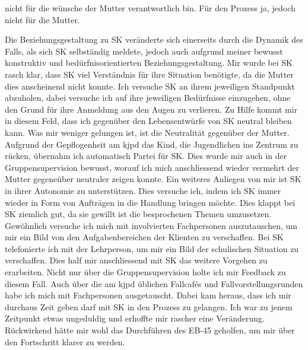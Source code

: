 nicht für die wünsche der Mutter verantwortlich bin. Für den Prozess ja, jedoch nicht für die Mutter. 

Die Beziehungsgestaltung zu SK veränderte sich einerseits durch die Dynamik des Falls, als sich SK selbständig meldete, jedoch auch aufgrund meiner bewusst konstruktiv und bedürfnisorientierten Beziehungsgestaltung. Mir wurde bei SK rasch klar, dass SK viel Verständnis für ihre Situation benötigte, da die Mutter dies anscheinend nicht konnte. Ich versuche SK an ihrem jeweiligen Standpunkt abzuholen, dabei versuche ich auf ihre jeweiligen Bedürfnisse einzugehen, ohne den Grund für ihre Anmeldung aus den Augen zu verlieren. Zu Hilfe kommt mir in diesem Feld, dass ich gegenüber den Lebensentwürfe von SK neutral bleiben kann. Was mir weniger gelungen ist, ist die Neutralität gegenüber der Mutter. Aufgrund der Gepflogenheit am \ac{kjpd} das Kind, die Jugendlichen ins Zentrum zu rücken, übernahm ich automatisch Partei für SK. Dies wurde mir auch in der Gruppensupervision bewusst, worauf ich mich anschliessend wieder vermehrt der Mutter gegeneüber neutraler zeigen konnte. Ein weiteres Anliegen von mir ist SK in ihrer Autonomie zu unterstützen. Dies versuche ich, indem ich SK immer wieder in Form von Aufträgen in die Handlung bringen möchte. Dies klappt bei SK ziemlich gut, da sie gewillt ist die besprochenen Themen umzusetzen. Gewöhnlich versuche ich mich mit involvierten Fachpersonen auszutauschen, um mir ein Bild von den Aufgabenbereichen der Klienten zu verschaffen. Bei SK telefonierte ich mit der Lehrperson, um mir ein Bild der schulischen Situation zu verschaffen. Dies half mir anschliessend mit SK das weitere Vorgehen zu erarbeiten. Nicht nur über die Gruppensupervision holte ich mir Feedback zu diesem Fall. Auch über die am \ac{kjpd} üblichen Fallcafés und Fallvorstellungsrunden habe ich mich mit Fachpersonen ausgetauscht. Dabei kam heraus, dass ich mir durchaus Zeit geben darf mit SK in den Prozess zu gelangen. Ich war zu jenem Zeitpunkt etwas ungeduldig und erhoffte mir rascher eine Veränderung. Rückwirkend hätte mir wohl das Durchführen des EB-45 geholfen, um mir über den Fortschritt klarer zu werden. 


